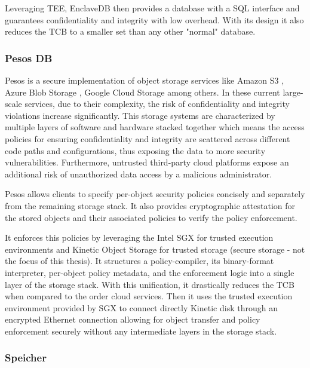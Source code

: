 Leveraging \gls{TEE}, EnclaveDB then provides a database with a \gls{SQL} interface and guarantees confidentiality and integrity with low overhead. With its design it also reduces the \gls{TCB} to a smaller set than any other "normal" database.

\subsubsection{Pesos DB}
\label{sssec:pesos_db}

Pesos \cite{pesos:1} is a secure implementation of object storage services like Amazon S3 \cite{s3:1}, Azure Blob Storage \cite{azureStorage:1}, Google Cloud Storage \cite{googleStorage:1} among others. In these current large-scale services, due to their complexity, the risk of confidentiality and integrity violations increase significantly. This storage systems are characterized by multiple layers of software and hardware stacked together which means the access policies for ensuring confidentiality and integrity are scattered across different code paths and configurations, thus exposing the data to more security vulnerabilities. Furthermore, untrusted third-party cloud platforms expose an additional risk of unauthorized data access by a malicious administrator.

Pesos allows clients to specify per-object security policies concisely and separately from the remaining storage stack. It also provides cryptographic attestation for the stored objects and their associated policies to verify the policy enforcement.

It enforces this policies by leveraging the Intel \gls{SGX} for trusted execution environments and Kinetic Object Storage \cite{kinetic:1} for trusted storage (secure storage - not the focus of this thesis). It structures a policy-compiler, its binary-format interpreter, per-object policy metadata, and the enforcement logic into a single layer of the storage stack. With this unification, it drastically reduces the \gls{TCB} when compared to the order cloud services. Then it uses the trusted execution environment provided by \gls{SGX} to connect directly Kinetic disk through an encrypted Ethernet connection allowing for object transfer and policy enforcement securely without any intermediate layers in the storage stack.

\subsubsection{Speicher}
\label{sssec:speicher}

